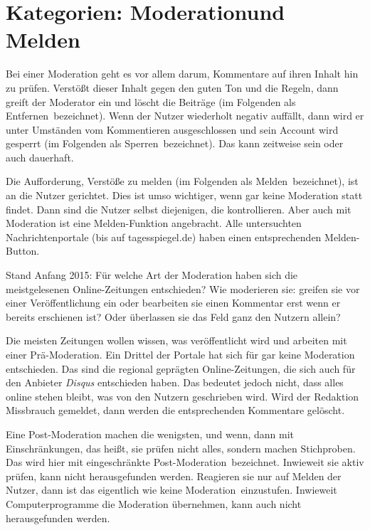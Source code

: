 \section{Kategorien: \glqq Moderation\grqq und \glqq Melden\grqq}

Bei einer Moderation geht es vor allem darum, Kommentare auf ihren Inhalt hin zu
prüfen. Verstößt dieser Inhalt gegen den guten Ton und die Regeln, dann greift
der Moderator ein und löscht die Beiträge (im Folgenden als \glqq
Entfernen\grqq\ bezeichnet). Wenn der Nutzer wiederholt negativ auffällt, dann
wird er unter Umständen vom Kommentieren ausgeschlossen und sein Account wird
gesperrt (im Folgenden als  \glqq Sperren\grqq\ bezeichnet). Das kann zeitweise
sein oder auch dauerhaft.

Die Aufforderung, Verstöße zu melden (im Folgenden als \glqq Melden\grqq\
bezeichnet), ist an die Nutzer gerichtet. Dies ist umso wichtiger, wenn gar
keine Moderation statt findet. Dann sind die Nutzer selbst diejenigen, die
kontrollieren. Aber auch mit Moderation ist eine Melden-Funktion angebracht.
Alle  untersuchten Nachrichtenportale (bis auf tagesspiegel.de) haben einen
entsprechenden Melden-Button.

Stand Anfang 2015: Für welche Art der Moderation haben sich die meistgelesenen
Online-Zeitungen entschieden? Wie moderieren sie: greifen sie vor einer
Veröffentlichung ein oder bearbeiten sie einen Kommentar erst wenn er bereits
erschienen ist? Oder überlassen sie das Feld ganz den Nutzern allein?

Die meisten Zeitungen wollen wissen, was veröffentlicht wird und arbeiten mit
einer Prä-Moderation.  Ein Drittel der Portale hat sich für gar keine Moderation
entschieden. Das sind die regional geprägten Online-Zeitungen, die sich auch für
den Anbieter {\slshape Disqus} entschieden haben. Das bedeutet jedoch nicht,
dass alles online stehen bleibt, was von den Nutzern geschrieben wird.  Wird der
Redaktion Missbrauch gemeldet, dann werden die entsprechenden Kommentare
gelöscht.

Eine Post-Moderation machen die wenigsten, und wenn, dann mit Einschränkungen,
das heißt, sie prüfen nicht alles, sondern machen Stichproben. Das wird hier mit
\glqq eingeschränkte Post-Moderation\grqq\ bezeichnet. Inwieweit sie aktiv prüfen,
kann nicht herausgefunden werden. Reagieren sie nur auf Melden der Nutzer, dann
ist das eigentlich wie \glqq keine Moderation\grqq\ einzustufen.
Inwieweit Computerprogramme die Moderation übernehmen, kann auch nicht
herausgefunden werden.

